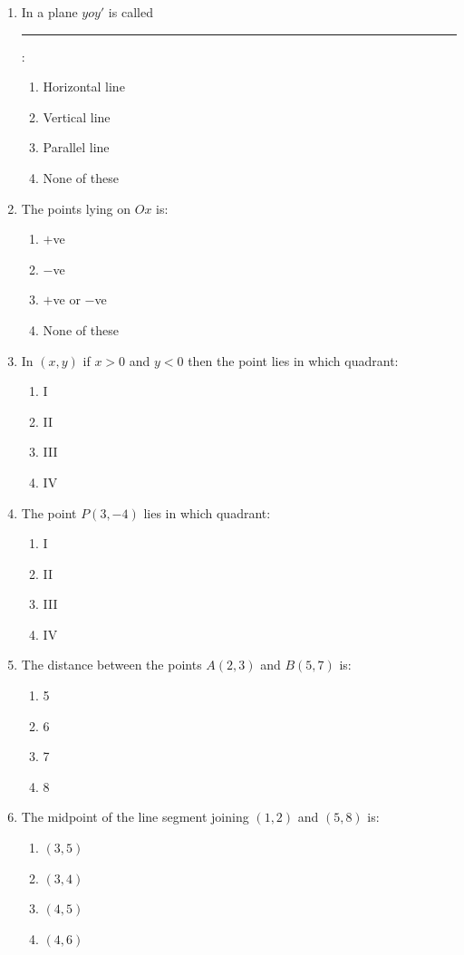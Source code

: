 \documentclass[11pt]{article}
\begin{document}
\begin{enumerate}[label=\textbf{\arabic*.}, start=204, leftmargin=2em]
\item In a plane $yoy'$ is called \rule{1cm}{0.4pt}:
\begin{enumerate}[label=(\Alph*)] \item Horizontal line \item Vertical line \item Parallel line \item None of these \end{enumerate}

\item The points lying on $Ox$ is:
\begin{enumerate}[label=(\Alph*)] \item $+$ve \item $-$ve \item $+$ve or $-$ve \item None of these \end{enumerate}

\item In $(x, y)$ if $x > 0$ and $y < 0$ then the point lies in which quadrant:
\begin{enumerate}[label=(\Alph*)] \item I \item II \item III \item IV \end{enumerate}

\item The point $P(3, -4)$ lies in which quadrant:
\begin{enumerate}[label=(\Alph*)] \item I \item II \item III \item IV \end{enumerate}

\item The distance between the points $A(2, 3)$ and $B(5, 7)$ is:
\begin{enumerate}[label=(\Alph*)] \item 5 \item 6 \item 7 \item 8 \end{enumerate}

\item The midpoint of the line segment joining $(1, 2)$ and $(5, 8)$ is:
\begin{enumerate}[label=(\Alph*)] \item $(3, 5)$ \item $(3, 4)$ \item $(4, 5)$ \item $(4, 6)$ \end{enumerate}


\end{enumerate}
\end{document}
